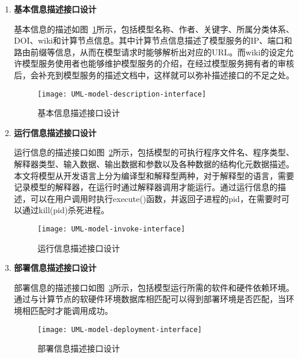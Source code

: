 \begin{enumerate}[(1)]
\item \textbf{基本信息描述接口设计}

基本信息的描述如图~\ref{fig:UML-model-description-interface}所示，包括模型名称、作者、关键字、所属分类体系、DOI、wiki和计算节点信息。其中计算节点信息描述了模型服务的IP、端口和路由前缀等信息，从而在模型请求时能够解析出对应的URL。而wiki的设定允许模型服务使用者也能够维护模型服务的介绍，在经过模型服务拥有者的审核后，会补充到模型服务的描述文档中，这样就可以弥补描述接口的不足之处。

\begin{figure}[!htbp]
    \centering
    \texttt{[image: UML-model-description-interface]}
    \caption{基本信息描述接口设计}
    \label{fig:UML-model-description-interface}
\end{figure}

\item \textbf{运行信息描述接口设计}
\label{sec:io-interface}

运行信息的描述接口如图~\ref{fig:UML-model-invoke-interface}所示，包括模型的可执行程序文件名、程序类型、解释器类型、输入数据、输出数据和参数以及各种数据的结构化元数据描述。本文将模型从开发语言上分为编译型和解释型两种，对于解释型的语言，需要记录模型的解释器，在运行时通过解释器调用才能运行。通过运行信息的描述，可以在用户调用时执行execute()函数，并返回子进程的pid，在需要时可以通过kill(pid)杀死进程。

\begin{figure}[!htbp]
    \centering
    \texttt{[image: UML-model-invoke-interface]}
    \caption{运行信息描述接口设计}
    \label{fig:UML-model-invoke-interface}
\end{figure}

\item \textbf{部署信息描述接口设计}

部署信息的描述接口如图~\ref{fig:UML-model-deployment-interface}所示，包括模型运行所需的软件和硬件依赖环境。通过与计算节点的软硬件环境数据库相匹配可以得到部署环境是否匹配，当环境相匹配时才能调用成功。

\begin{figure}[!htbp]
    \centering
    \texttt{[image: UML-model-deployment-interface]}
    \caption{部署信息描述接口设计}
    \label{fig:UML-model-deployment-interface}
\end{figure}
\end{enumerate}


